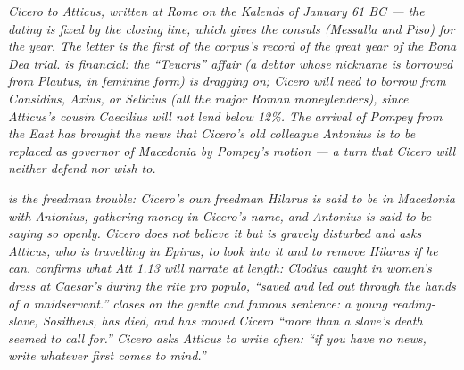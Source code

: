 
\textit{Cicero to Atticus, written at Rome on the Kalends
of January 61 BC --- the dating is fixed by the closing
line, which gives the consuls (Messalla and Piso) for the
year. The letter is the first of the corpus's record of
the great year of the Bona Dea trial.  is
financial: the ``Teucris'' affair (a debtor whose nickname
is borrowed from Plautus, in feminine form) is dragging
on; Cicero will need to borrow from Considius, Axius, or
Selicius (all the major Roman moneylenders), since
Atticus's cousin Caecilius will not lend below 12\%. The
arrival of Pompey from the East has brought the news that
Cicero's old colleague Antonius is to be replaced as
governor of Macedonia by Pompey's motion --- a turn that
Cicero will neither defend nor wish to.}

\textit{ is the freedman trouble: Cicero's
own freedman Hilarus is said to be in Macedonia with
Antonius, gathering money in Cicero's name, and Antonius
is said to be saying so openly. Cicero does not believe
it but is gravely disturbed and asks Atticus, who is
travelling in Epirus, to look into it and to remove
Hilarus if he can.  confirms what Att 1.13
will narrate at length: Clodius caught in women's dress
at Caesar's during the rite \textit{pro populo}, ``saved
and led out through the hands of a maidservant.''
 closes on the gentle and famous
sentence: a young reading-slave, Sositheus, has died,
and has moved Cicero ``more than a slave's death seemed
to call for.'' Cicero asks Atticus to write often: ``if
you have no news, write whatever first comes to mind.''}
